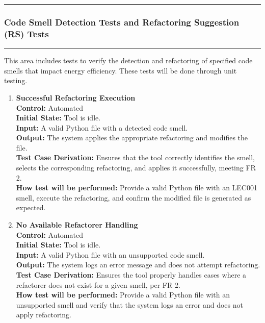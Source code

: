 \documentclass[12pt, titlepage]{article}
\newcommand{\colorrule}{\textcolor{BlueViolet}{\rule{\linewidth}{2pt}}}
\begin{document}
\begin{enumerate}[label={\bf
    \textcolor{Maroon}{test-FR-IA-\arabic*}}, wide=0pt, font=\itshape]
    \noindent
    \colorrule

    \subsubsection{Code Smell Detection Tests and Refactoring
    Suggestion (RS) Tests} \label{4.1.2}
    \colorrule

    \medskip

    \noindent
    This area includes tests to verify the detection and refactoring
    of specified code smells that impact energy efficiency. These tests will be
    done through unit testing.

    \begin{enumerate}[label={\bf
    \textcolor{Maroon}{test-FR-IA-\arabic*}}, wide=0pt, font=\itshape]
    \item \textbf{Successful Refactoring Execution} \\[2mm]
    \textbf{Control:} Automated \\
    \textbf{Initial State:} Tool is idle. \\
    \textbf{Input:} A valid Python file with a detected code smell. \\
    \textbf{Output:} The system applies the appropriate refactoring and modifies the file. \\[2mm]
    \textbf{Test Case Derivation:} Ensures that the tool correctly identifies the smell, selects the corresponding refactoring, and applies it successfully, meeting FR 2. \\[2mm]
    \textbf{How test will be performed:} Provide a valid Python file with an LEC001 smell, execute the refactoring, and confirm the modified file is generated as expected. 
    
    \item \textbf{No Available Refactorer Handling} \\[2mm]
    \textbf{Control:} Automated \\
    \textbf{Initial State:} Tool is idle. \\
    \textbf{Input:} A valid Python file with an unsupported code smell. \\
    \textbf{Output:} The system logs an error message and does not attempt refactoring. \\[2mm]
    \textbf{Test Case Derivation:} Ensures the tool properly handles cases where a refactorer does not exist for a given smell, per FR 2. \\[2mm]
    \textbf{How test will be performed:} Provide a valid Python file with an unsupported smell and verify that the system logs an error and does not apply refactoring.
    

\end{enumerate}
\end{enumerate}
\end{document}
